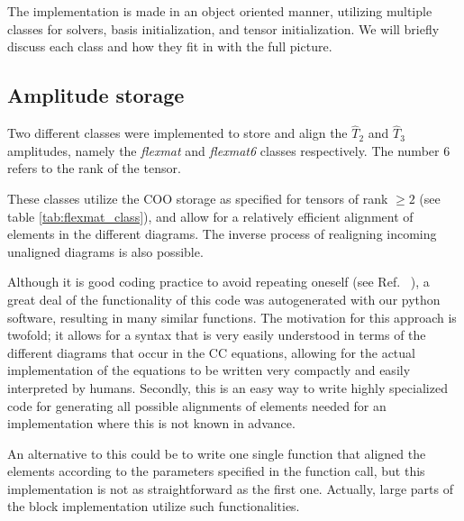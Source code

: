 The implementation is made in an object oriented manner, utilizing multiple classes for solvers, basis initialization, and tensor initialization. We will briefly discuss each class and how they fit in with the full picture.

\subsection{Amplitude storage}

Two different classes were implemented to store and align the $\hat{T}_2$ and $\hat{T}_3$ amplitudes, namely the \emph{flexmat} and \emph{flexmat6} classes respectively. The number 6 refers to the rank of the tensor. 

These classes utilize the COO storage as specified for tensors of rank
$\geq 2$ (see table \ref{tab:flexmat_class}), and allow for a
relatively efficient alignment of elements in the different
diagrams. The inverse process of realigning incoming unaligned
diagrams is also possible.

Although it is good coding practice to avoid repeating oneself (see
Ref.~ \cite{DRY}), a great deal of the functionality of this code was
autogenerated with our python software, resulting in many similar
functions. The motivation for this approach is twofold; it allows for
a syntax that is very easily understood in terms of the different
diagrams that occur in the CC equations, allowing for the actual
implementation of the equations to be written very compactly and
easily interpreted by humans. Secondly, this is an easy way to write
highly specialized code for generating all possible alignments of
elements needed for an implementation where this is not known in
advance. 

An alternative to this could be to write one single function that
aligned the elements according to the parameters specified in the
function call, but this implementation is not as straightforward as
the first one. Actually, large parts of the block implementation
utilize such functionalities.


